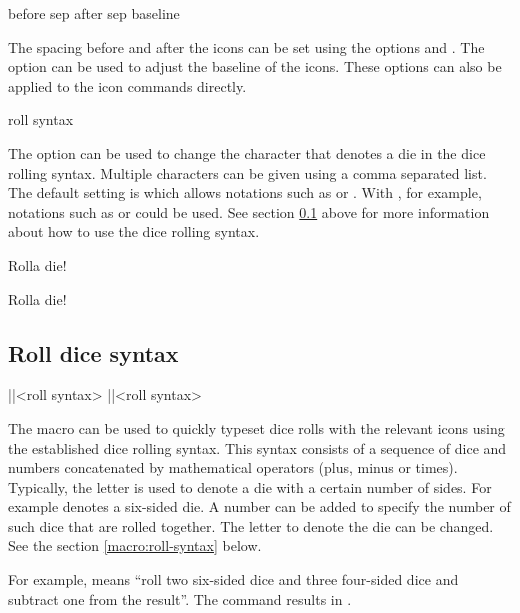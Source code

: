 \documentclass[a4paper]{article}
\begin{document}
\begin{macrodef}
before sep
after sep
baseline
\end{macrodef}
The spacing before and after the icons can be set using the options  and . The option  can be used to adjust the baseline of the icons. These options can also be applied to the icon commands directly.

\label{macro:roll-syntax}
\begin{macrodef}
roll syntax
\end{macrodef}
The option  can be used to change the character that denotes a die in the dice rolling syntax. Multiple characters can be given using a comma separated list. The default setting is  which allows notations such as  or . With , for example, notations such as  or  could be used. See section \ref{sec:roll-dice-syntax} above for more information about how to use the dice rolling syntax.

\begin{codeexample}
Rolla die!

Rolla die!
\end{codeexample}

\subsection{Roll dice syntax}\label{sec:roll-dice-syntax}

\begin{macrodef}
|\roll|{<roll syntax>}
|\DndiconsRoll|{<roll syntax>}
\end{macrodef}
The \macro{\roll} macro can be used to quickly typeset dice rolls with the relevant icons using the established dice rolling syntax. This syntax consists of a sequence of dice and numbers concatenated by mathematical operators (plus, minus or times). Typically, the letter  is used to denote a die with a certain number of sides. For example  denotes a six-sided die. A number can be added to specify the number of such dice that are rolled together. The letter to denote the die can be changed. See the section \ref{macro:roll-syntax} below.

For example,  means ``roll two six-sided dice and three four-sided dice and subtract one from the result''. The command  results in .
\end{document}
